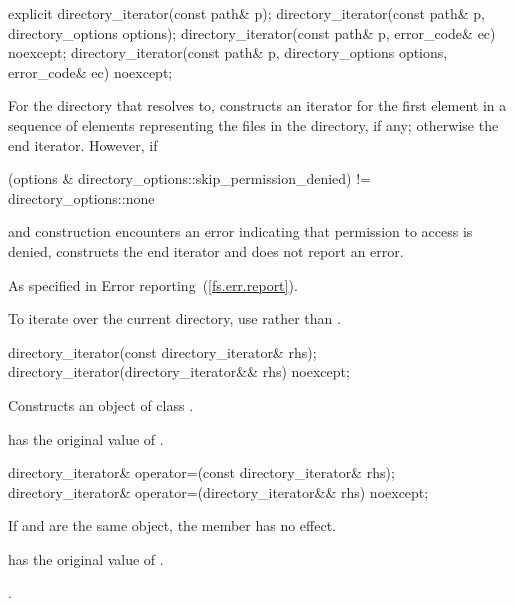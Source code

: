 \begin{itemdecl}
explicit directory_iterator(const path& p);
directory_iterator(const path& p, directory_options options);
directory_iterator(const path& p, error_code& ec) noexcept;
directory_iterator(const path& p, directory_options options, error_code& ec) noexcept;

\end{itemdecl}

\begin{itemdescr}

\pnum
\effects For the directory that  resolves to, constructs an
iterator for the first element in a sequence of 
elements representing the files in the directory, if any; otherwise the end
iterator. However, if
\begin{codeblock}
(options & directory_options::skip_permission_denied) != directory_options::none
\end{codeblock}
and construction encounters an error indicating
that permission to access  is denied, constructs the end iterator
and does not report an error.

\pnum
\throws As specified in Error reporting~(\ref{fs.err.report}).

\pnum
\begin{note} To iterate over the current directory, use  rather than . \end{note}
\end{itemdescr}

\begin{itemdecl}
directory_iterator(const directory_iterator& rhs);
directory_iterator(directory_iterator&& rhs) noexcept;
\end{itemdecl}

\begin{itemdescr}
\pnum
\effects Constructs an object of class .

\pnum
\postconditions {} has the original value of .
\end{itemdescr}

\begin{itemdecl}
directory_iterator& operator=(const directory_iterator& rhs);
directory_iterator& operator=(directory_iterator&& rhs) noexcept;
\end{itemdecl}

\begin{itemdescr}
\pnum
\effects If  and  are the same
  object, the member has no effect.

\pnum
\postconditions {} has the original value of .

\pnum
\returns {}.
\end{itemdescr}

